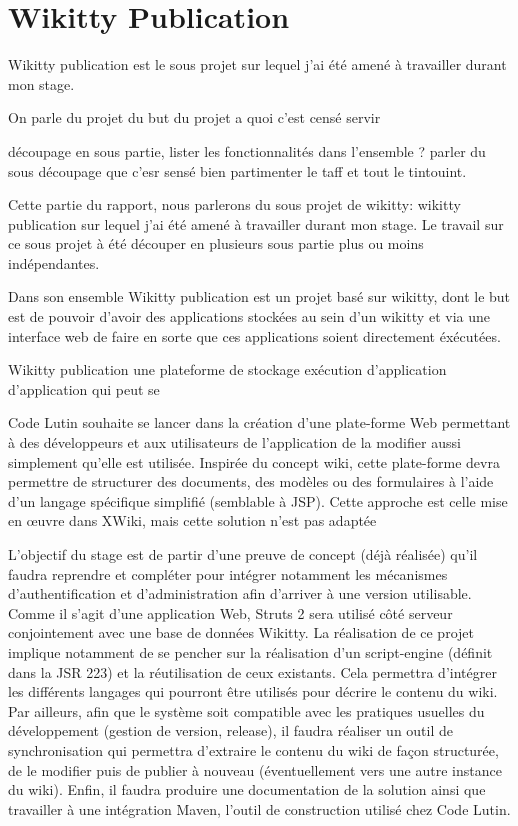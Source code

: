 \section{Wikitty Publication}

Wikitty publication est le sous projet sur lequel j'ai été amené à travailler
durant mon stage.

On parle du projet du but du projet
a quoi c'est censé servir

découpage en sous partie, lister les fonctionnalités dans l'ensemble ?
parler du sous découpage que c'esr sensé bien partimenter le taff et tout le
tintouint.



Cette partie du rapport, nous parlerons du sous projet de wikitty: wikitty
publication sur lequel j'ai été amené à travailler durant mon stage. 
Le travail sur ce sous projet à été découper en plusieurs sous partie plus ou
moins indépendantes. 

Dans son ensemble Wikitty publication est un projet basé sur wikitty, dont le
but est de pouvoir d'avoir des applications stockées au sein d'un wikitty et
via une interface web de faire en sorte que ces applications soient directement
éxécutées. 

Wikitty publication une plateforme de stockage exécution d'application
d'application qui peut se





Code Lutin souhaite se lancer dans la création d'une plate-forme Web permettant à des développeurs
et aux utilisateurs de l'application de la modifier aussi simplement qu'elle est utilisée.
Inspirée du concept wiki, cette plate-forme devra permettre de structurer des documents, des
modèles ou des formulaires à l'aide d'un langage spécifique simplifié (semblable à JSP). Cette
approche est celle mise en œuvre dans XWiki, mais cette solution n'est pas adaptée


L'objectif du stage est de partir d'une preuve de concept (déjà réalisée) qu'il faudra reprendre et
compléter pour intégrer notamment les mécanismes d'authentification et d'administration afin
d'arriver à une version utilisable. Comme il s'agit d'une application Web, Struts 2 sera utilisé côté
serveur conjointement avec une base de données Wikitty.
La réalisation de ce projet implique notamment de se pencher sur la réalisation d'un script-engine
(définit dans la JSR 223) et la réutilisation de ceux existants. Cela permettra d'intégrer les différents
langages qui pourront être utilisés pour décrire le contenu du wiki.
Par ailleurs, afin que le système soit compatible avec les pratiques usuelles du développement
(gestion de version, release), il faudra réaliser un outil de synchronisation qui permettra d'extraire le
contenu du wiki de façon structurée, de le modifier puis de publier à nouveau (éventuellement vers
une autre instance du wiki).
Enfin, il faudra produire une documentation de la solution ainsi que travailler à une intégration
Maven, l'outil de construction utilisé chez Code Lutin.





